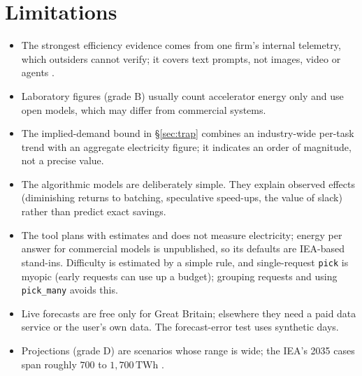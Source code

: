 \documentclass[11pt]{article}
\theoremstyle{definition}
\theoremstyle{remark}
\newcommand{\TWh}{\,\mathrm{TWh}}
\begin{document}
\section{Limitations}\label{sec:limits}
\begin{itemize}[leftmargin=*,itemsep=1pt]
  \item The strongest efficiency evidence comes from one firm's internal telemetry, which outsiders cannot verify; it covers text prompts, not images, video or agents \citep{elsworth2025}.
  \item Laboratory figures (grade B) usually count accelerator energy only and use open models, which may differ from commercial systems.
  \item The implied-demand bound in \S\ref{sec:trap} combines an industry-wide per-task trend with an aggregate electricity figure; it indicates an order of magnitude, not a precise value.
  \item The algorithmic models are deliberately simple. They explain observed effects (diminishing returns to batching, speculative speed-ups, the value of slack) rather than predict exact savings.
  \item The tool plans with estimates and does not measure electricity; energy per answer for commercial models is unpublished, so its defaults are IEA-based stand-ins. Difficulty is estimated by a simple rule, and single-request \texttt{pick} is myopic (early requests can use up a budget); grouping requests and using \texttt{pick\_many} avoids this.
  \item Live forecasts are free only for Great Britain; elsewhere they need a paid data service or the user's own data. The forecast-error test uses synthetic days.
  \item Projections (grade D) are scenarios whose range is wide; the IEA's 2035 cases span roughly $700$ to $1{,}700\TWh$ \citep{iea2025}.
\end{itemize}

\end{document}
